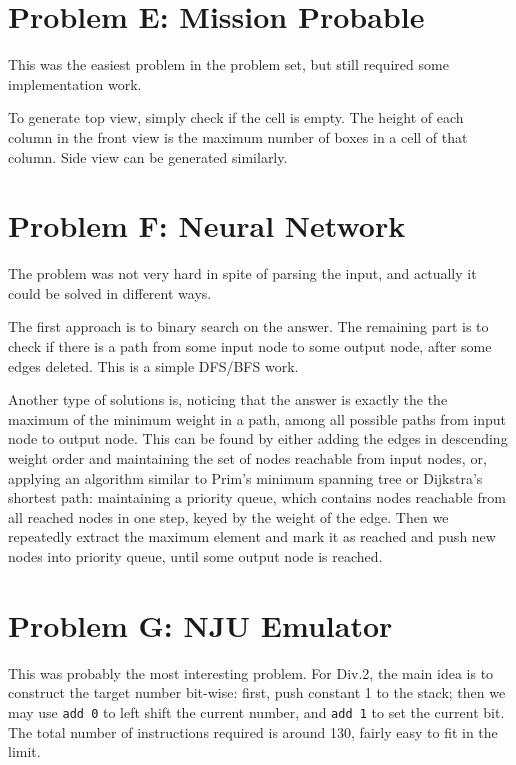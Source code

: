 \documentclass[a4paper,10.5pt,twoside]{article}
\begin{document}
\section*{Problem E: Mission Probable}

This was the easiest problem in the problem set, but still required some implementation work.

To generate top view, simply check if the cell is empty. The height of each column in the front view is the maximum number of boxes in a cell of that column. Side view can be generated similarly.

\section*{Problem F: Neural Network}

The problem was not very hard in spite of parsing the input, and actually it could be solved in different ways.

The first approach is to binary search on the answer. The remaining part is to check if there is a path from some input node to some output node, after some edges deleted. This is a simple DFS/BFS work.

Another type of solutions is, noticing that the answer is exactly the the maximum of the minimum weight in a path, among all possible paths from input node to output node. This can be found by either adding the edges in descending weight order and maintaining the set of nodes reachable from input nodes, or, applying an algorithm similar to Prim's minimum spanning tree or Dijkstra's shortest path: maintaining a priority queue, which contains nodes reachable from all reached nodes in one step, keyed by the weight of the edge. Then we repeatedly extract the maximum element and mark it as reached and push new nodes into priority queue, until some output node is reached.

\section*{Problem G: NJU Emulator}

This was probably the most interesting problem. For Div.2, the main idea is to construct the target number bit-wise: first, push constant 1 to the stack; then we may use \texttt{add 0} to left shift the current number, and \texttt{add 1} to set the current bit. The total number of instructions required is around 130, fairly easy to fit in the limit.
\end{document}
